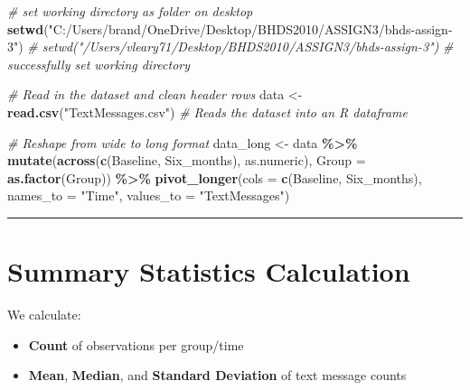 \documentclass[
]{article}
\newenvironment{Shaded}{\begin{snugshade}}{\end{snugshade}}
\newcommand{\AttributeTok}[1]{\textcolor[rgb]{0.13,0.29,0.53}{#1}}
\newcommand{\CommentTok}[1]{\textcolor[rgb]{0.56,0.35,0.01}{\textit{#1}}}
\newcommand{\FunctionTok}[1]{\textcolor[rgb]{0.13,0.29,0.53}{\textbf{#1}}}
\newcommand{\NormalTok}[1]{#1}
\newcommand{\OtherTok}[1]{\textcolor[rgb]{0.56,0.35,0.01}{#1}}
\newcommand{\SpecialCharTok}[1]{\textcolor[rgb]{0.81,0.36,0.00}{\textbf{#1}}}
\newcommand{\StringTok}[1]{\textcolor[rgb]{0.31,0.60,0.02}{#1}}
\providecommand{\tightlist}{%
  \setlength{\itemsep}{0pt}\setlength{\parskip}{0pt}}
\begin{document}
\begin{Shaded}
\begin{Highlighting}[]
\CommentTok{\# set working directory as folder on desktop}
 \FunctionTok{setwd}\NormalTok{(}\StringTok{"C:/Users/brand/OneDrive/Desktop/BHDS2010/ASSIGN3/bhds{-}assign{-}3"}\NormalTok{)}
\CommentTok{\# setwd("/Users/vleary71/Desktop/BHDS2010/ASSIGN3/bhds{-}assign{-}3")}
\CommentTok{\# successfully set working directory}

\CommentTok{\# Read in the dataset and clean header rows}
\NormalTok{data }\OtherTok{\textless{}{-}} \FunctionTok{read.csv}\NormalTok{(}\StringTok{"TextMessages.csv"}\NormalTok{)  }\CommentTok{\# Reads the dataset into an R dataframe}

\CommentTok{\# Reshape from wide to long format}
\NormalTok{data\_long }\OtherTok{\textless{}{-}}\NormalTok{ data }\SpecialCharTok{\%\textgreater{}\%}
  \FunctionTok{mutate}\NormalTok{(}\FunctionTok{across}\NormalTok{(}\FunctionTok{c}\NormalTok{(Baseline, Six\_months), as.numeric),}
         \AttributeTok{Group =} \FunctionTok{as.factor}\NormalTok{(Group)) }\SpecialCharTok{\%\textgreater{}\%}
  \FunctionTok{pivot\_longer}\NormalTok{(}\AttributeTok{cols =} \FunctionTok{c}\NormalTok{(Baseline, Six\_months),}
               \AttributeTok{names\_to =} \StringTok{"Time"}\NormalTok{,}
               \AttributeTok{values\_to =} \StringTok{"TextMessages"}\NormalTok{)}
\end{Highlighting}
\end{Shaded}

\begin{center}\rule{0.5\linewidth}{0.5pt}\end{center}

\section{Summary Statistics
Calculation}\label{summary-statistics-calculation}

We calculate:

\begin{itemize}
\tightlist
\item
  \textbf{Count} of observations per group/time
\item
  \textbf{Mean}, \textbf{Median}, and \textbf{Standard Deviation} of
  text message counts
\end{itemize}
\end{document}
